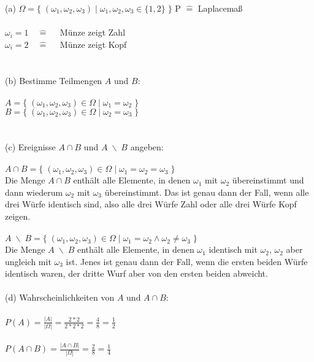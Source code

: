 \documentclass[10pt,a4paper]{article}
\newcommand{\bs}{\;\backslash\;}
\begin{document}
		(a) \quad
		$\Omega = \{\; (\omega_1, \omega_2, \omega_3) \;|\; \omega_1, \omega_2, \omega_3 \in \{1, 2\} \;\}$ \qquad P $\mathrel{\hat{=}}$ Laplacemaß
		\\
		\\
		$\omega_i = 1 \quad \mathrel{\hat{=}} \quad$ Münze zeigt Zahl 
		\\
		$\omega_i = 2 \quad \mathrel{\hat{=}} \quad$ Münze zeigt Kopf
		\\
		\\
		\\
		(b) \quad Bestimme Teilmengen $A$ und $B$:
		\\
		\\
		$A = \{\; (\omega_1, \omega_2, \omega_3) \in \Omega \;|\; \omega_1 = \omega_2 \;\}$
		\\
		$B = \{\; (\omega_1, \omega_2, \omega_3) \in \Omega \;|\; \omega_2 = \omega_3 \;\}$
		\\
		\\
		\\
		(c) \quad Ereignisse $A \cap B$ und $A \bs B$ angeben:
		\\
		\\
		$A \cap B = \{\; (\omega_1, \omega_2, \omega_3) \in \Omega \;|\; \omega_1 = \omega_2 = \omega_3 \;\}$
		\\
		Die Menge $A \cap B$ enthält alle Elemente, in denen $\omega_1$ mit $\omega_2$ übereinstimmt und dann wiederum $\omega_2$ mit $\omega_3$ übereinstimmt. Das ist genau dann der Fall, wenn alle drei Würfe identisch sind, also alle drei Würfe Zahl oder alle drei Würfe Kopf zeigen.
		\\
		\\
		$A \bs B = \{\; (\omega_1, \omega_2, \omega_3) \in \Omega \;|\; \omega_1 = \omega_2 \land \omega_2 \neq \omega_3 \;\}$
		\\
		Die Menge $A \bs B$ enthält alle Elemente, in denen $\omega_1$ identisch mit $\omega_2$, $\omega_2$ aber ungleich mit $\omega_3$ ist. Jenes ist genau dann der Fall, wenn die ersten beiden Würfe identisch waren, der dritte Wurf aber von den ersten beiden abweicht.
		\\
		\\
		(d) \quad Wahrscheinlichkeiten von $A$ und $A \cap B$:
		\\
		\\
		$P(A) = \frac{|A|}{|\Omega|} = \frac{2*2}{2*2*2} = \frac{4}{8} = \frac{1}{2}$
		\\
		\\
		$P(A \cap B) = \frac{|A \cap B|}{|\Omega|} = \frac{2}{8} = \frac{1}{4}$
		
		
\end{document}

